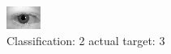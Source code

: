 \begin{figure}[h!]
\begin{center}
\includegraphics[width=0.60\columnwidth]{figures/ID522_class_2_target_3.png}
\end{center}
\caption{ Classification: 2 actual target: 3}
\label{fig:ID522_class_2_target_3}
\end{figure}
